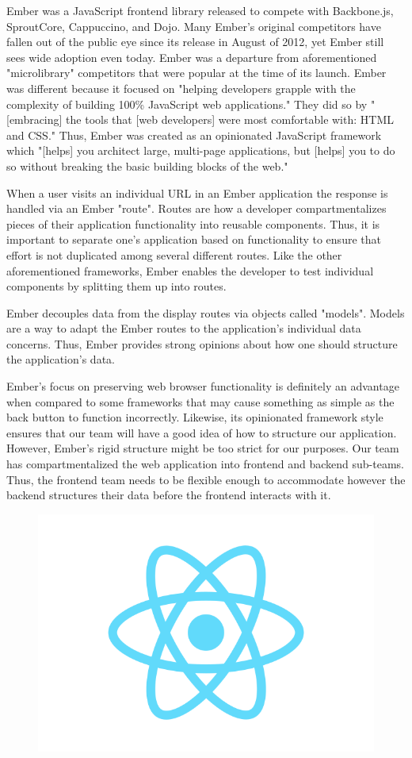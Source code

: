 \documentclass[12pt]{report}
\begin{document}
\begin{enumerate}
Ember was a JavaScript frontend library released to compete with Backbone.js, SproutCore, Cappuccino, and Dojo.\cite{emberrelease} Many Ember's original competitors have fallen out of the public eye since its release in August of 2012, yet Ember still sees wide adoption even today. Ember was a departure from aforementioned "microlibrary" competitors that were popular at the time of its launch. Ember was different because it focused on "helping developers grapple with the complexity of building 100\% JavaScript web applications."\cite{emberrelease} They did so by "[embracing] the tools that [web developers] were most comfortable with: HTML and CSS."\cite{emberrelease} Thus, Ember was created as an opinionated JavaScript framework which "[helps] you architect large, multi-page applications, but [helps] you to do so without breaking the basic building blocks of the web."\cite{emberrelease}

When a user visits an individual URL in an Ember application the response is handled via an Ember "route".\cite{emberrouting} Routes are how a developer compartmentalizes pieces of their application functionality into reusable components. Thus, it is important to separate one's application based on functionality to ensure that effort is not duplicated among several different routes. Like the other aforementioned frameworks, Ember enables the developer to test individual components by splitting them up into routes.

Ember decouples data from the display routes via objects called "models".\cite{embermodel} Models are a way to adapt the Ember routes to the application's individual data concerns. Thus, Ember provides strong opinions about how one should structure the application's data.

Ember's focus on preserving web browser functionality is definitely an advantage when compared to some frameworks that may cause something as simple as the back button to function incorrectly. Likewise, its opinionated framework style ensures that our team will have a good idea of how to structure our application. However, Ember's rigid structure might be too strict for our purposes. Our team has compartmentalized the web application into frontend and backend sub-teams. Thus, the frontend team needs to be flexible enough to accommodate however the backend structures their data before the frontend interacts with it.

\begin{figure}[h]
	\centering
	\includegraphics[width=0.25\linewidth]{react}
\end{figure}


\end{enumerate}
\end{document}
